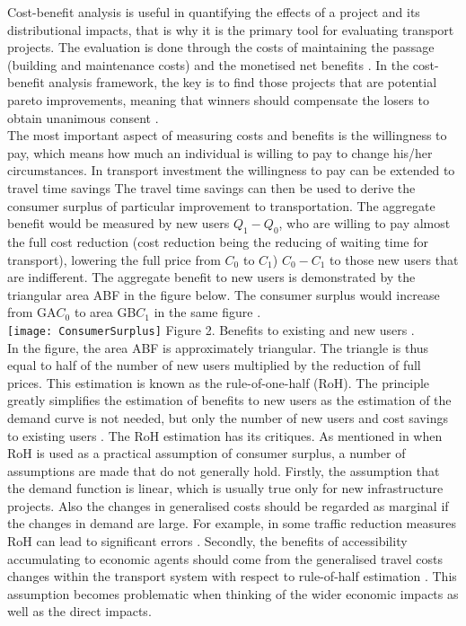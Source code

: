 \documentclass[a4paper, 12 pt]{article}   	%
\begin{document}
Cost-benefit analysis is useful in quantifying the effects of a project and its distributional impacts, that is why it is the primary tool for evaluating transport projects. The evaluation is done through the costs of maintaining the passage (building and maintenance costs) and the monetised net benefits \citep{liikenne}. In the cost-benefit analysis framework, the key is to find those projects that are potential pareto improvements, meaning that winners should compensate the losers to obtain unanimous consent \citep{small}. \\

The most important aspect of measuring costs and benefits is the willingness to pay, which means how much an individual is willing to pay to change his/her circumstances. In transport investment the willingness to pay can be extended to travel time savings \citep{small} The travel time savings can then be used to derive the consumer surplus of particular improvement to transportation. The aggregate benefit would be measured by new users \(Q_1 - Q_0\), who are willing to pay almost the full cost reduction (cost reduction being the reducing of waiting time for transport), lowering the full price from \(C_0\) to \(C_1\))   \(C_0 - C_1\) to those new users that are indifferent. The aggregate benefit to new users is demonstrated by the triangular area ABF in the figure below. The consumer surplus would increase from GA\(C_0\) to area GB\(C_1\) in the same figure \citep{small}. \\

\texttt{[image: ConsumerSurplus]}
Figure 2. Benefits to existing and new users \citep{small}. \\

In the figure, the area ABF is approximately triangular. The triangle is thus equal to half of the number of new users multiplied by the reduction of full prices. This estimation is known as the rule-of-one-half (RoH). The principle greatly simplifies the estimation of benefits to new users as the estimation of the demand curve is not needed, but only the number of new users and cost savings to existing users \citep{small}. The RoH estimation has its critiques. As mentioned in \cite{geurs} when RoH is used as a practical assumption of consumer surplus, a number of assumptions are made that do not generally hold. Firstly, the assumption that the demand function is linear, which is usually true only for new infrastructure projects. Also the changes in generalised costs should be regarded as marginal if the changes in demand are large. For example, in some traffic reduction measures RoH can lead to significant errors \citep{geurs}. Secondly, the benefits of accessibility accumulating to economic agents should come from the generalised travel costs changes within the transport system with respect to rule-of-half estimation \citep{geurs}. This assumption becomes problematic when thinking of the wider economic impacts as well as the direct impacts. \\
\end{document}
